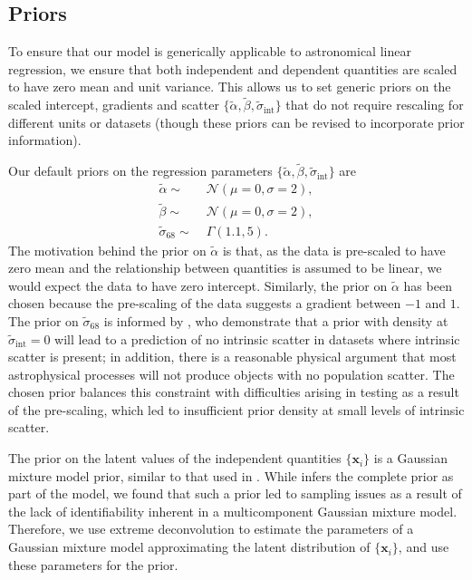 \documentclass[fleqn,usenatbib]{rasti}
\newcommand{\indepvars}{\boldsymbol{x}_i}
\newcommand{\intercept}{\alpha}
\newcommand{\covariate}{\beta}
\begin{document}
\subsection{Priors}
\label{sec:formalism.prior}

To ensure that our model is generically applicable to astronomical linear
regression, we ensure that both independent and dependent quantities are scaled
to have zero mean and unit variance. This allows us to set generic priors on the
scaled intercept, gradients and scatter $\{\tilde{\intercept},
\tilde{\covariate}, \tilde{\sigma}_{\text{int}}\}$ that do not require rescaling
for different units or datasets (though these priors can be revised to
incorporate prior information).

Our default priors on the regression parameters $\{\tilde{\intercept},
\tilde{\covariate}, \tilde{\sigma}_{\text{int}}\}$ are
\begin{align}
    \tilde{\intercept} \sim&\; \mathcal N(\mu = 0, \sigma = 2), \\
    \tilde{\covariate} \sim&\; \mathcal N(\mu = 0, \sigma = 2), \\
    \tilde{\sigma}_{68} \sim&\; \Gamma(1.1, 5).
\end{align}
The motivation behind the prior on $\tilde{\intercept}$ is that, as the data is
pre-scaled to have zero mean and the relationship between quantities is assumed
to be linear, we would expect the data to have zero intercept. Similarly, the
prior on $\tilde{\alpha}$ has been chosen because the pre-scaling of the data
suggests a gradient between $-1$ and $1$. The prior on $\tilde{\sigma}_{68}$ is
informed by \citet{Chung:2013}, who demonstrate that a prior with density at
$\tilde{\sigma}_{\text{int}} = 0$ will lead to a prediction of no intrinsic
scatter in datasets where intrinsic scatter is present; in addition, there is a
reasonable physical argument that most astrophysical processes will not produce
objects with no population scatter. The chosen prior balances this constraint
with difficulties arising in testing as a result of the pre-scaling, which led
to insufficient prior density at small levels of intrinsic scatter.

The prior on the latent values of the independent quantities $\{\indepvars\}$ is
a Gaussian mixture model prior, similar to that used in \citet{Kelly:2007}.
While \citeauthor{Kelly:2007} infers the complete prior as part of the model, we
found that such a prior led to sampling issues as a result of the lack of
identifiability inherent in a multicomponent Gaussian mixture model. Therefore,
we use extreme deconvolution \citep{Bovy:2011} to estimate the parameters of a
Gaussian mixture model approximating the latent distribution of
$\{\indepvars\}$, and use these parameters for the prior.
\end{document}
